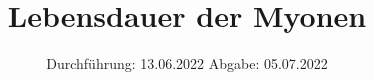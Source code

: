 
\usepackage{wrapfig}

\subject{Versuch Nr.V1}
\title{Lebensdauer der Myonen}
\date{%
  Durchführung: 13.06.2022
  \hspace{3em}
  Abgabe: 05.07.2022
}



\maketitle
\thispagestyle{empty}
\tableofcontents
\newpage 







\nocite{*}

\printbibliography{}


